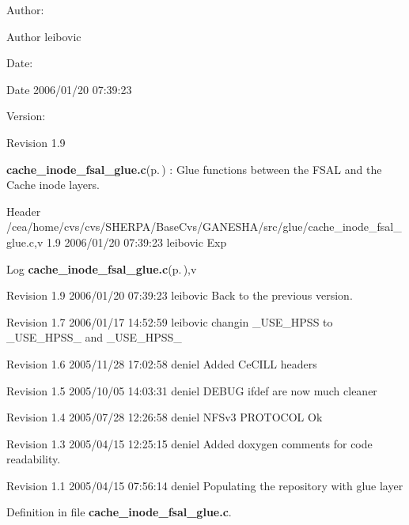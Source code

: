 \begin{Desc}
\item[Author:]\begin{Desc}
\item[Author]leibovic \end{Desc}
\end{Desc}
\begin{Desc}
\item[Date:]\begin{Desc}
\item[Date]2006/01/20 07:39:23 \end{Desc}
\end{Desc}
\begin{Desc}
\item[Version:]\begin{Desc}
\item[Revision]1.9 \end{Desc}
\end{Desc}
{\bf cache\_\-inode\_\-fsal\_\-glue.c}{\rm (p.\,\pageref{cache__inode__fsal__glue_8c})} : Glue functions between the FSAL and the Cache inode layers.

\begin{Desc}
\item[Header]/cea/home/cvs/cvs/SHERPA/Base\-Cvs/GANESHA/src/glue/cache\_\-inode\_\-fsal\_\-glue.c,v 1.9 2006/01/20 07:39:23 leibovic Exp \end{Desc}


\begin{Desc}
\item[Log]{\bf cache\_\-inode\_\-fsal\_\-glue.c}{\rm (p.\,\pageref{cache__inode__fsal__glue_8c})},v \end{Desc}
Revision 1.9 2006/01/20 07:39:23 leibovic Back to the previous version.

Revision 1.7 2006/01/17 14:52:59 leibovic changin \_\-USE\_\-HPSS to \_\-USE\_\-HPSS\_ and \_\-USE\_\-HPSS\_

Revision 1.6 2005/11/28 17:02:58 deniel Added Ce\-CILL headers

Revision 1.5 2005/10/05 14:03:31 deniel DEBUG ifdef are now much cleaner

Revision 1.4 2005/07/28 12:26:58 deniel NFSv3 PROTOCOL Ok

Revision 1.3 2005/04/15 12:25:15 deniel Added doxygen comments for code readability.

Revision 1.1 2005/04/15 07:56:14 deniel Populating the repository with glue layer

Definition in file {\bf cache\_\-inode\_\-fsal\_\-glue.c}.

